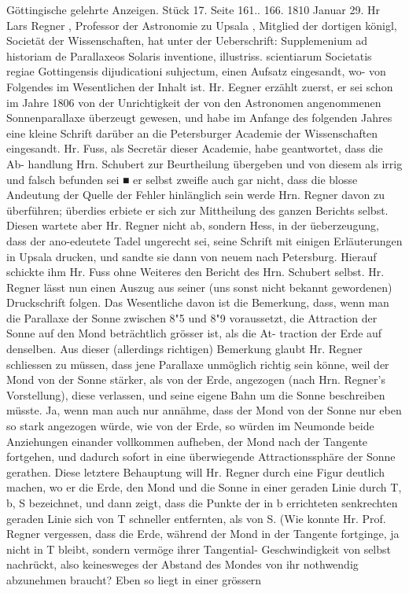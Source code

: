 \documentclass[12pt,a4paper]{article}
\begin{document}
Göttingische  gelehrte  Anzeigen.     Stück  17.     Seite  161..  166.     1810  Januar  29. Hr  Lars  Regner  ,  Professor  der  Astronomie  zu  Upsala ,  Mitglied  der  dortigen  königl,  Societät  der Wissenschaften,  hat  unter  der  Ueberschrift:  Supplemenium  ad  historiam  de  Parallaxeos  Solaris  inventione, illustriss.  scientiarum  Societatis  regiae  Gottingensis  dijudicationi  suhjectum,  einen  Aufsatz  eingesandt,  wo- von Folgendes  im  Wesentlichen  der  Inhalt  ist.  Hr.  Eegner  erzählt  zuerst,  er  sei  schon  im  Jahre  1806 von  der  Unrichtigkeit  der  von  den  Astronomen  angenommenen  Sonnenparallaxe  überzeugt  gewesen,  und habe  im  Anfange  des  folgenden  Jahres  eine  kleine  Schrift  darüber  an  die  Petersburger  Academie  der Wissenschaften  eingesandt.  Hr.  Fuss,  als  Secretär  dieser  Academie,  habe  geantwortet,  dass  die  Ab- handlung Hrn.  Schubert  zur  Beurtheilung  übergeben  und  von  diesem  als  irrig  und  falsch  befunden  sei  ■ er  selbst  zweifle  auch  gar  nicht,  dass  die  blosse  Andeutung  der  Quelle  der  Fehler  hinlänglich  sein  werde Hrn.  Regner  davon  zu  überführen;  überdies  erbiete  er  sich  zur  Mittheilung  des  ganzen  Berichts  selbst. Diesen  wartete  aber  Hr.  Regner  nicht  ab,  sondern  Hess,  in  der  üeberzeugung,  dass  der  ano-edeutete Tadel  ungerecht  sei,  seine  Schrift  mit  einigen  Erläuterungen  in  Upsala  drucken,  und  sandte  sie  dann von  neuem  nach  Petersburg.  Hierauf  schickte  ihm  Hr.  Fuss  ohne  Weiteres  den  Bericht  des  Hrn. Schubert   selbst. Hr.  Regner  lässt  nun  einen  Auszug  aus  seiner  (uns  sonst  nicht  bekannt  gewordenen)  Druckschrift folgen.  Das  Wesentliche  davon  ist  die  Bemerkung,  dass,  wenn  man  die  Parallaxe  der  Sonne  zwischen 8"5  und  8"9  voraussetzt,  die  Attraction  der  Sonne  auf  den  Mond  beträchtlich  grösser  ist,  als  die  At- traction  der  Erde  auf  denselben.  Aus  dieser  (allerdings  richtigen)  Bemerkung  glaubt  Hr.  Regner  schliessen zu  müssen,  dass  jene  Parallaxe  unmöglich  richtig  sein  könne,  weil  der  Mond  von  der  Sonne  stärker, als  von  der  Erde,  angezogen  (nach  Hrn.  Regner's  Vorstellung),  diese  verlassen,  und  seine  eigene  Bahn um  die  Sonne  beschreiben  müsste.  Ja,  wenn  man  auch  nur  annähme,  dass  der  Mond  von  der  Sonne nur  eben  so  stark  angezogen  würde,  wie  von  der  Erde,  so  würden  im  Neumonde  beide  Anziehungen einander  vollkommen  aufheben,  der  Mond  nach  der  Tangente  fortgehen,  und  dadurch  sofort  in  eine überwiegende  Attractionssphäre  der  Sonne  gerathen.  Diese  letztere  Behauptung  will  Hr.  Regner  durch eine  Figur  deutlich  machen,  wo  er  die  Erde,  den  Mond  und  die  Sonne  in  einer  geraden  Linie  durch T,  b,  S  bezeichnet,  und  dann  zeigt,  dass  die  Punkte  der  in  b  errichteten  senkrechten  geraden  Linie sich  von  T  schneller  entfernten,  als  von  S.  (Wie  konnte  Hr.  Prof.  Regner  vergessen,  dass  die  Erde, während  der  Mond  in  der  Tangente  fortginge,  ja  nicht  in  T  bleibt,  sondern  vermöge  ihrer  Tangential- Geschwindigkeit  von  selbst  nachrückt,  also  keinesweges  der  Abstand  des  Mondes  von  ihr  nothwendig abzunehmen  braucht?  Eben  so  liegt  in  einer  grössern  
\end{document}
